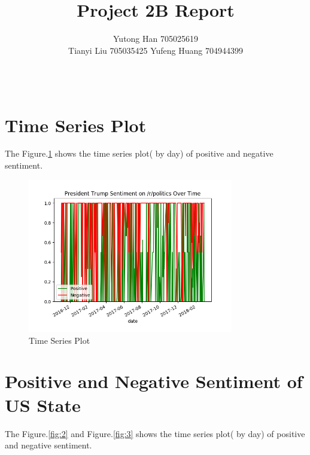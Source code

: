 \documentclass[12pt]{article}
\begin{document}
 
 
\title{Project 2B Report}
\author{Yutong Han 705025619 \\
		Tianyi Liu 705035425
		Yufeng Huang 704944399\\
		\\
		\\
		}
\maketitle
 
\section{Time Series Plot}
The Figure.\ref{fig:1} shows the time series plot( by day) of positive and negative sentiment.

\begin{figure}[!h]
     \begin{center}
                  \includegraphics[width=0.8\textwidth]{../plots/part1.png}
    \end{center}
    \caption{%
       Time Series Plot 
     }%
   \label{fig:1}
\end{figure}



\section{Positive and Negative Sentiment of US State}
The Figure.\ref{fig:2} and Figure.\ref{fig:3} shows the time series plot( by day) of positive and negative sentiment.
\end{document}
